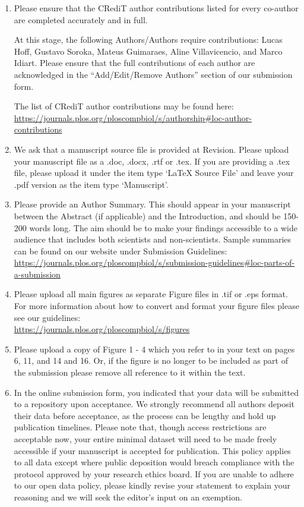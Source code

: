 \documentclass[a4paper, 11pt]{article}
\begin{document}
\begin{enumerate}
    \item Please ensure that the CRediT author contributions listed for every co-author are completed accurately and in full.
    
    At this stage, the following Authors/Authors require contributions: Lucas Hoff, Gustavo Soroka, Mateus Guimaraes, Aline Villavicencio, and Marco Idiart. Please ensure that the full contributions of each author are acknowledged in the ``Add/Edit/Remove Authors'' section of our submission form.
    
    The list of CRediT author contributions may be found here:\\
    \url{https://journals.plos.org/ploscompbiol/s/authorship#loc-author-contributions}
    
    \item We ask that a manuscript source file is provided at Revision. Please upload your manuscript file as a .doc, .docx, .rtf or .tex. If you are providing a .tex file, please upload it under the item type `LaTeX Source File' and leave your .pdf version as the item type `Manuscript'.
    
    \item Please provide an Author Summary. This should appear in your manuscript between the Abstract (if applicable) and the Introduction, and should be 150-200 words long. The aim should be to make your findings accessible to a wide audience that includes both scientists and non-scientists. Sample summaries can be found on our website under Submission Guidelines:\\
    \url{https://journals.plos.org/ploscompbiol/s/submission-guidelines#loc-parts-of-a-submission}
    
    \item Please upload all main figures as separate Figure files in .tif or .eps format. For more information about how to convert and format your figure files please see our guidelines:\\
    \url{https://journals.plos.org/ploscompbiol/s/figures}
    
    \item Please upload a copy of Figure 1 - 4 which you refer to in your text on pages 6, 11, and 14 and 16. Or, if the figure is no longer to be included as part of the submission please remove all reference to it within the text.
    
    \item In the online submission form, you indicated that your data will be submitted to a repository upon acceptance. We strongly recommend all authors deposit their data before acceptance, as the process can be lengthy and hold up publication timelines. Please note that, though access restrictions are acceptable now, your entire minimal dataset will need to be made freely accessible if your manuscript is accepted for publication. This policy applies to all data except where public deposition would breach compliance with the protocol approved by your research ethics board. If you are unable to adhere to our open data policy, please kindly revise your statement to explain your reasoning and we will seek the editor's input on an exemption.
    

\end{enumerate}
\end{document}
